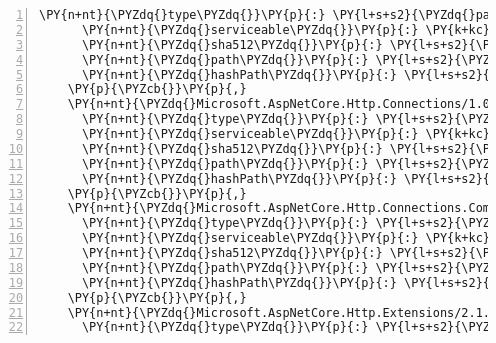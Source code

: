 \begin{Verbatim}[commandchars=\\\{\},numbers=left,firstnumber=1,stepnumber=1,numberblanklines=0]
      \PY{n+nt}{\PYZdq{}type\PYZdq{}}\PY{p}{:} \PY{l+s+s2}{\PYZdq{}package\PYZdq{}}\PY{p}{,}
      \PY{n+nt}{\PYZdq{}serviceable\PYZdq{}}\PY{p}{:} \PY{k+kc}{true}\PY{p}{,}
      \PY{n+nt}{\PYZdq{}sha512\PYZdq{}}\PY{p}{:} \PY{l+s+s2}{\PYZdq{}sha512\PYZhy{}LQJH1z6k7sxxER4AEpbrq5Cpi1N/fGMThCE57ET+L6teVtc70N+CeDLKrZJzmyYEbenkrcTDyx4pzg6GM5VKEw==\PYZdq{}}\PY{p}{,}
      \PY{n+nt}{\PYZdq{}path\PYZdq{}}\PY{p}{:} \PY{l+s+s2}{\PYZdq{}microsoft.aspnetcore.http.abstractions/2.1.0\PYZhy{}rc1\PYZhy{}final\PYZdq{}}\PY{p}{,}
      \PY{n+nt}{\PYZdq{}hashPath\PYZdq{}}\PY{p}{:} \PY{l+s+s2}{\PYZdq{}microsoft.aspnetcore.http.abstractions.2.1.0\PYZhy{}rc1\PYZhy{}final.nupkg.sha512\PYZdq{}}
    \PY{p}{\PYZcb{}}\PY{p}{,}
    \PY{n+nt}{\PYZdq{}Microsoft.AspNetCore.Http.Connections/1.0.0\PYZhy{}rc1\PYZhy{}final\PYZdq{}}\PY{p}{:} \PY{p}{\PYZob{}}
      \PY{n+nt}{\PYZdq{}type\PYZdq{}}\PY{p}{:} \PY{l+s+s2}{\PYZdq{}package\PYZdq{}}\PY{p}{,}
      \PY{n+nt}{\PYZdq{}serviceable\PYZdq{}}\PY{p}{:} \PY{k+kc}{true}\PY{p}{,}
      \PY{n+nt}{\PYZdq{}sha512\PYZdq{}}\PY{p}{:} \PY{l+s+s2}{\PYZdq{}sha512\PYZhy{}1TkBUEMLOJ4gYku2kL419PIL8ZPvY3UBS4XJWk9lNTm++xGZBJ1FsF0Ll1E9qukPJKUvDZp61mltmGTRIJkoHQ==\PYZdq{}}\PY{p}{,}
      \PY{n+nt}{\PYZdq{}path\PYZdq{}}\PY{p}{:} \PY{l+s+s2}{\PYZdq{}microsoft.aspnetcore.http.connections/1.0.0\PYZhy{}rc1\PYZhy{}final\PYZdq{}}\PY{p}{,}
      \PY{n+nt}{\PYZdq{}hashPath\PYZdq{}}\PY{p}{:} \PY{l+s+s2}{\PYZdq{}microsoft.aspnetcore.http.connections.1.0.0\PYZhy{}rc1\PYZhy{}final.nupkg.sha512\PYZdq{}}
    \PY{p}{\PYZcb{}}\PY{p}{,}
    \PY{n+nt}{\PYZdq{}Microsoft.AspNetCore.Http.Connections.Common/1.0.0\PYZhy{}rc1\PYZhy{}final\PYZdq{}}\PY{p}{:} \PY{p}{\PYZob{}}
      \PY{n+nt}{\PYZdq{}type\PYZdq{}}\PY{p}{:} \PY{l+s+s2}{\PYZdq{}package\PYZdq{}}\PY{p}{,}
      \PY{n+nt}{\PYZdq{}serviceable\PYZdq{}}\PY{p}{:} \PY{k+kc}{true}\PY{p}{,}
      \PY{n+nt}{\PYZdq{}sha512\PYZdq{}}\PY{p}{:} \PY{l+s+s2}{\PYZdq{}sha512\PYZhy{}PEtxoONKa0uTAciBe8MfpcVG4ahG6ccfAnWxjtmUOr5IAjwUVrJANWkPsOsw1BvoGAvsWSPzhPpdUga8SRaaYA==\PYZdq{}}\PY{p}{,}
      \PY{n+nt}{\PYZdq{}path\PYZdq{}}\PY{p}{:} \PY{l+s+s2}{\PYZdq{}microsoft.aspnetcore.http.connections.common/1.0.0\PYZhy{}rc1\PYZhy{}final\PYZdq{}}\PY{p}{,}
      \PY{n+nt}{\PYZdq{}hashPath\PYZdq{}}\PY{p}{:} \PY{l+s+s2}{\PYZdq{}microsoft.aspnetcore.http.connections.common.1.0.0\PYZhy{}rc1\PYZhy{}final.nupkg.sha512\PYZdq{}}
    \PY{p}{\PYZcb{}}\PY{p}{,}
    \PY{n+nt}{\PYZdq{}Microsoft.AspNetCore.Http.Extensions/2.1.0\PYZhy{}rc1\PYZhy{}final\PYZdq{}}\PY{p}{:} \PY{p}{\PYZob{}}
      \PY{n+nt}{\PYZdq{}type\PYZdq{}}\PY{p}{:} \PY{l+s+s2}{\PYZdq{}package\PYZdq{}}\PY{p}{,}

\end{Verbatim}
